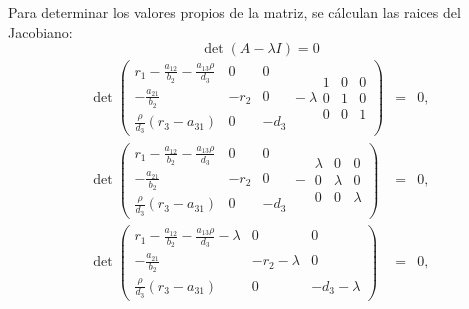\documentclass[letterpaper,11pt]{article}
\begin{document}
Para determinar los valores propios de la matriz, se c\'{a}lculan las raices
del Jacobiano:%
\begin{equation*}
\det \left( A-\lambda I\right) =0
\end{equation*}%
\begin{eqnarray*}
\det \left( 
\begin{array}{ccc}
r_{1}-\frac{a_{12}}{b_{2}}-\frac{a_{13}\rho }{d_{3}} & 0 & 0 \\ 
-\frac{a_{21}}{b_{2}} & -r_{2} & 0 \\ 
\frac{\rho }{d_{3}}\left( r_{3}-a_{31}\right) & 0 & -d_{3}%
\end{array}%
-\lambda 
\begin{array}{ccc}
1 & 0 & 0 \\ 
0 & 1 & 0 \\ 
0 & 0 & 1%
\end{array}%
\right) &=&0, \\
\det \left( 
\begin{array}{ccc}
r_{1}-\frac{a_{12}}{b_{2}}-\frac{a_{13}\rho }{d_{3}} & 0 & 0 \\ 
-\frac{a_{21}}{b_{2}} & -r_{2} & 0 \\ 
\frac{\rho }{d_{3}}\left( r_{3}-a_{31}\right) & 0 & -d_{3}%
\end{array}%
-%
\begin{array}{ccc}
\lambda & 0 & 0 \\ 
0 & \lambda & 0 \\ 
0 & 0 & \lambda%
\end{array}%
\right) &=&0, \\
\det \left( 
\begin{array}{ccc}
r_{1}-\frac{a_{12}}{b_{2}}-\frac{a_{13}\rho }{d_{3}}-\lambda & 0 & 0 \\ 
-\frac{a_{21}}{b_{2}} & -r_{2}-\lambda & 0 \\ 
\frac{\rho }{d_{3}}\left( r_{3}-a_{31}\right) & 0 & -d_{3}-\lambda%
\end{array}%
\right) &=&0,
\end{eqnarray*}
\end{document}
